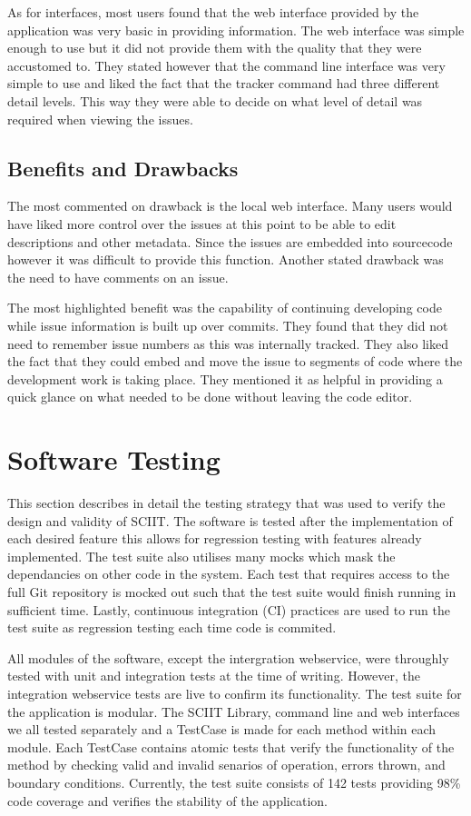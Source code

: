 \documentclass{mproj}
\begin{document}
As for interfaces, most users found that the web interface provided by the application was very basic in providing information. The web interface was simple enough to use but it did not provide them with the quality that they were accustomed to. They stated however that the command line interface was very simple to use and liked the fact that the tracker command had three different detail levels. This way they were able to decide on what level of detail was required when viewing the issues.

\subsection{Benefits and Drawbacks}

The most commented on drawback is the local web interface. Many users would have liked more control over the issues at this point to be able to edit descriptions and other metadata. Since the issues are embedded into sourcecode however it was difficult to provide this function. Another stated drawback was the need to have comments on an issue.

The most highlighted benefit was the capability of continuing developing code while issue information is built up over commits. They found that they did not need to remember issue numbers as this was internally tracked. They also liked the fact that they could embed and move the issue to segments of code where the development work is taking place. They mentioned it as helpful in providing a quick glance on what needed to be done without leaving the code editor.


\section{Software Testing} %

This section describes in detail the testing strategy that was used to verify the design and validity of SCIIT. The software is tested after the implementation of each desired feature this allows for regression testing with features already implemented. The test suite also utilises many mocks which mask the dependancies on other code in the system. Each test that requires access to the full Git repository is mocked out such that the test suite would finish running in sufficient time. Lastly, continuous integration (CI) practices are used to run the test suite as regression testing each time code is commited.

All modules of the software, except the intergration webservice, were throughly tested with unit and integration tests at the time of writing. However, the integration webservice tests are live to confirm its functionality. The test suite for the application is modular. The SCIIT Library, command line and web interfaces we all tested separately and a TestCase is made for each method within each module. Each TestCase contains atomic tests that verify the functionality of the method by checking valid and invalid senarios of operation, errors thrown, and boundary conditions. Currently, the test suite consists of 142 tests providing 98\% code coverage and verifies the stability of the application. 
\end{document}
